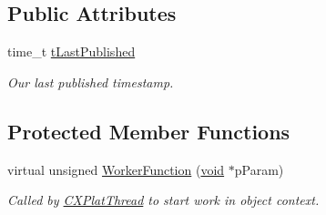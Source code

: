 \subsection*{\-Public \-Attributes}
\begin{DoxyCompactItemize}
\item 
time\-\_\-t \hyperlink{class_c_d_b_publisher_a2cf425adefacf57d8ab03b3c77a7de8c}{t\-Last\-Published}
\begin{DoxyCompactList}\small\item\em \-Our last published timestamp. \end{DoxyCompactList}\end{DoxyCompactItemize}
\subsection*{\-Protected \-Member \-Functions}
\begin{DoxyCompactItemize}
\item 
virtual unsigned \hyperlink{class_c_d_b_publisher_afc97488b3517b0d78331b6c54475ab81}{\-Worker\-Function} (\hyperlink{_cpclient_8h_a6464f7480a0fd0ee170cba12b2c0497f}{void} $\ast$p\-Param)
\begin{DoxyCompactList}\small\item\em \-Called by \hyperlink{class_c_x_plat_thread}{\-C\-X\-Plat\-Thread} to start work in object context. \end{DoxyCompactList}\end{DoxyCompactItemize}
